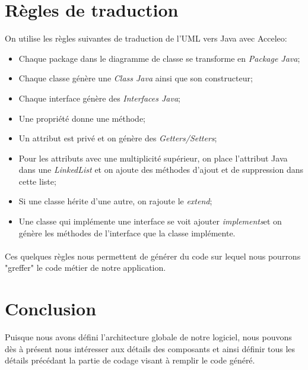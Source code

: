 \section{Règles de traduction}

On utilise les règles suivantes de traduction de l'UML vers Java avec Acceleo:
\begin{itemize}
\item Chaque package  dans le diagramme de classe se transforme en \textit{Package Java};
\item Chaque classe génère une \textit{Class Java} ainsi que son constructeur;
\item Chaque interface génère des \textit{Interfaces Java};
\item Une propriété donne une méthode;
\item Un attribut est privé et on génère des \textit{Getters/Setters};
\item Pour les attributs avec une multiplicité supérieur, on place l'attribut Java dans une \textit{LinkedList} et on ajoute des méthodes d'ajout et de suppression dans cette liste;
\item Si une classe hérite d'une autre, on rajoute le \textit{extend};
\item Une classe qui implémente une interface se voit ajouter \textit{implements}et on génère les méthodes de l'interface que la classe implémente.
\end{itemize}

\paragraph*{}
Ces quelques règles nous permettent de générer du code sur lequel nous pourrons "greffer" le code métier de notre application.

\section*{Conclusion}
Puisque nous avons défini l'architecture globale de notre logiciel, nous pouvons dès à présent nous intéresser aux détails des composants et ainsi définir tous les détails précédant la partie de codage visant à remplir le code généré.


	
	
	
	